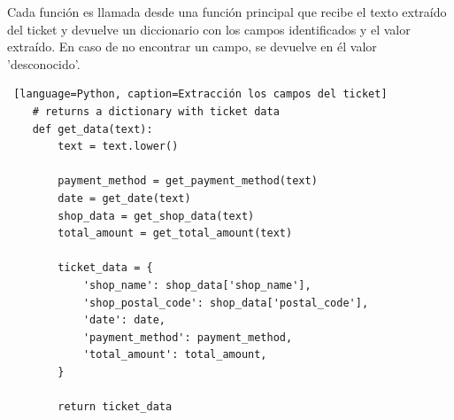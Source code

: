 Cada función es llamada desde una función principal que recibe el texto extraído del ticket y devuelve un diccionario con los campos identificados y el valor extraído. En caso de no encontrar un campo, se devuelve en él valor 'desconocido'.

\begin{lstlisting} [language=Python, caption=Extracción los campos del ticket]
    # returns a dictionary with ticket data
    def get_data(text):
        text = text.lower()

        payment_method = get_payment_method(text)
        date = get_date(text)
        shop_data = get_shop_data(text)
        total_amount = get_total_amount(text)

        ticket_data = {
            'shop_name': shop_data['shop_name'],
            'shop_postal_code': shop_data['postal_code'],
            'date': date,
            'payment_method': payment_method,
            'total_amount': total_amount,
        }

        return ticket_data
\end{lstlisting}


